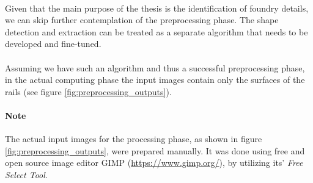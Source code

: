 \paragraph{}
Given that the main purpose of the thesis is the identification of foundry details, we can skip further contemplation of the preprocessing phase. The shape detection and extraction can be treated as a separate algorithm that needs to be developed and fine-tuned.

\paragraph{}
Assuming we have such an algorithm and thus a successful preprocessing phase, in the actual computing phase the input images contain only the surfaces of the rails (see figure \ref{fig:preprocessing_outputs}).

\paragraph{Note}
The actual input images for the processing phase, as shown in figure \ref{fig:preprocessing_outputs}, were prepared manually. It was done using free and open source image editor GIMP (\url{https://www.gimp.org/}), by utilizing its' \textit{Free Select Tool}.

